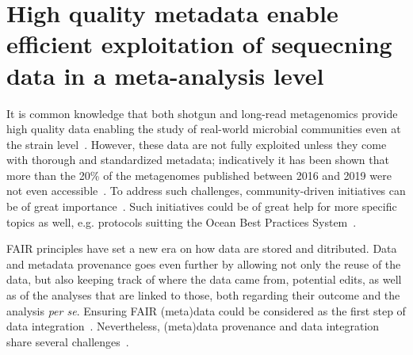 \section{High quality metadata enable efficient exploitation of sequecning data in a meta-analysis level}
\label{concl:metadata}
   
      It is common knowledge that both shotgun and long-read metagenomics provide 
      high quality data enabling the study of real-world microbial communities even at the strain level~\citep{meyer2022critical}.
      However, these data are not fully exploited unless they come with thorough and standardized metadata;
      indicatively it has been shown that more than the 20\% of the metagenomes published between 2016 and 2019 
      were not even accessible~\citep{eckert2020every}.
      To address such challenges, community-driven initiatives can be of great importance~\citep{yilmaz2011minimum, vangay2021microbiome}.
      Such initiatives could be of great help for more specific topics as well, e.g. protocols suitting the 
      Ocean Best Practices System~\citep{samuel2021towards}.

      FAIR principles have set a new era on how data are stored and ditributed. 
      Data and metadata provenance goes even further by allowing not only the reuse of the data, 
      but also keeping track of where the data came from, potential edits, 
      as well as of the analyses that are linked to those, both regarding their outcome and the analysis \textit{per se}. 
      Ensuring FAIR (meta)data could be considered as the first step of data integration~\citep{freire2008provenance, deelman2010metadata}.
      Nevertheless, (meta)data provenance and data integration share several challenges~\citep{cheney2009provenance}. 
   
